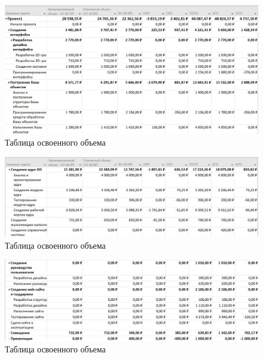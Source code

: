 \begin{figure}[H]
	\begin{center}
		\includegraphics[scale=0.4]{inc/img/volume1.jpg}
	\end{center}
	\captionsetup{justification=centering}
	\caption{Таблица освоенного объема}
	\label{img:volume1}
\end{figure}

\begin{figure}[H]
	\begin{center}
		\includegraphics[scale=0.45]{inc/img/volume2.jpg}
	\end{center}
	\captionsetup{justification=centering}
	\caption{Таблица освоенного объема}
	\label{img:volume2}
\end{figure}

\begin{figure}[H]
	\begin{center}
		\includegraphics[scale=0.45]{inc/img/volume3.jpg}
	\end{center}
	\captionsetup{justification=centering}
	\caption{Таблица освоенного объема}
	\label{img:volume3}
\end{figure}

